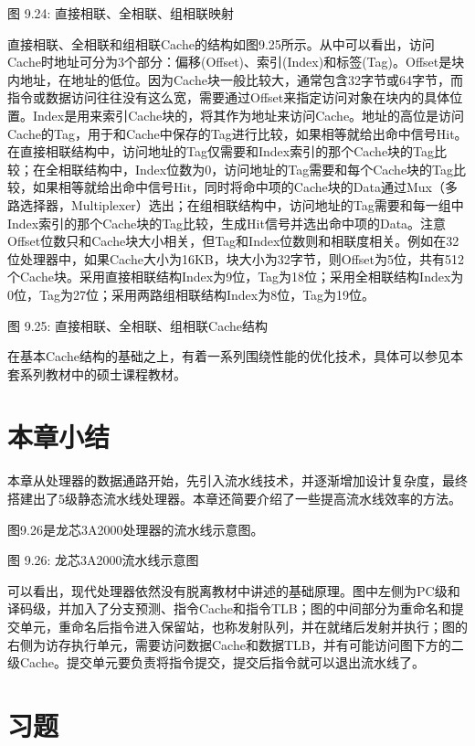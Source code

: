 \documentclass[]{ctexbook}
\begin{document}
图 9.24: 直接相联、全相联、组相联映射

直接相联、全相联和组相联Cache的结构如图9.25所示。从中可以看出，访问Cache时地址可分为3个部分：偏移(Offset)、索引(Index)和标签(Tag)。Offset是块内地址，在地址的低位。因为Cache块一般比较大，通常包含32字节或64字节，而指令或数据访问往往没有这么宽，需要通过Offset来指定访问对象在块内的具体位置。Index是用来索引Cache块的，将其作为地址来访问Cache。地址的高位是访问Cache的Tag，用于和Cache中保存的Tag进行比较，如果相等就给出命中信号Hit。在直接相联结构中，访问地址的Tag仅需要和Index索引的那个Cache块的Tag比较；在全相联结构中，Index位数为0，访问地址的Tag需要和每个Cache块的Tag比较，如果相等就给出命中信号Hit，同时将命中项的Cache块的Data通过Mux（多路选择器，Multiplexer）选出；在组相联结构中，访问地址的Tag需要和每一组中Index索引的那个Cache块的Tag比较，生成Hit信号并选出命中项的Data。注意Offset位数只和Cache块大小相关，但Tag和Index位数则和相联度相关。例如在32位处理器中，如果Cache大小为16KB，块大小为32字节，则Offset为5位，共有512个Cache块。采用直接相联结构Index为9位，Tag为18位；采用全相联结构Index为0位，Tag为27位；采用两路组相联结构Index为8位，Tag为19位。

图 9.25: 直接相联、全相联、组相联Cache结构

在基本Cache结构的基础之上，有着一系列围绕性能的优化技术，具体可以参见本套系列教材中的硕士课程教材。

\hypertarget{ux672cux7ae0ux5c0fux7ed3-8}{%
\section{本章小结}\label{ux672cux7ae0ux5c0fux7ed3-8}}

本章从处理器的数据通路开始，先引入流水线技术，并逐渐增加设计复杂度，最终搭建出了5级静态流水线处理器。本章还简要介绍了一些提高流水线效率的方法。

图9.26是龙芯3A2000处理器的流水线示意图。

图 9.26: 龙芯3A2000流水线示意图

可以看出，现代处理器依然没有脱离教材中讲述的基础原理。图中左侧为PC级和译码级，并加入了分支预测、指令Cache和指令TLB；图的中间部分为重命名和提交单元，重命名后指令进入保留站，也称发射队列，并在就绪后发射并执行；图的右侧为访存执行单元，需要访问数据Cache和数据TLB，并有可能访问图下方的二级Cache。提交单元要负责将指令提交，提交后指令就可以退出流水线了。

\hypertarget{ux4e60ux9898-8}{%
\section{习题}\label{ux4e60ux9898-8}}
\end{document}
